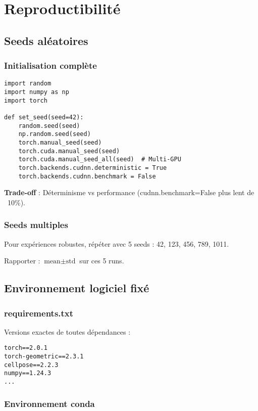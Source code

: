 \section{Reproductibilité}

\subsection{Seeds aléatoires}

\subsubsection{Initialisation complète}

\begin{verbatim}
import random
import numpy as np
import torch

def set_seed(seed=42):
    random.seed(seed)
    np.random.seed(seed)
    torch.manual_seed(seed)
    torch.cuda.manual_seed(seed)
    torch.cuda.manual_seed_all(seed)  # Multi-GPU
    torch.backends.cudnn.deterministic = True
    torch.backends.cudnn.benchmark = False
\end{verbatim}

\textbf{Trade-off} : Déterminisme vs performance (cudnn.benchmark=False plus lent de ~10\%).

\subsubsection{Seeds multiples}

Pour expériences robustes, répéter avec 5 seeds : 42, 123, 456, 789, 1011.

Rapporter : $\text{mean} \pm \text{std}$ sur ces 5 runs.

\subsection{Environnement logiciel fixé}

\subsubsection{requirements.txt}

Versions exactes de toutes dépendances :
\begin{verbatim}
torch==2.0.1
torch-geometric==2.3.1
cellpose==2.2.3
numpy==1.24.3
...
\end{verbatim}

\subsubsection{Environnement conda}


